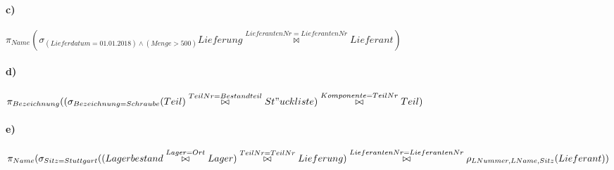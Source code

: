 \documentclass[12pt]{article}
\begin{document}
 	
 	\paragraph*{c)}
 	$\pi_{Name}(\sigma_{(Lieferdatum = 01.01.2018) \wedge (Menge > 500)}Lieferung \overset{LieferantenNr = LieferantenNr}{\bowtie} Lieferant)$
 	
 	
 	\paragraph*{d)}
 	$\pi_{Bezeichnung}(\large(\sigma_{Bezeichnung=Schraube}(Teil) \overset{TeilNr = Bestandteil}{\bowtie} St"uckliste\large) \overset{Komponente = TeilNr}{\bowtie} Teil)$
 	
 	\paragraph*{e)}
 	$\pi_{Name}( \sigma_{Sitz = Stuttgart}((Lagerbestand \overset{Lager = Ort}{\bowtie} Lager) \overset{TeilNr = TeilNr}{\bowtie} Lieferung)\\ \overset{LieferantenNr = LieferantenNr}{\bowtie} \rho_{LNummer,LName,Sitz}(Lieferant))$
 
\end{document}
